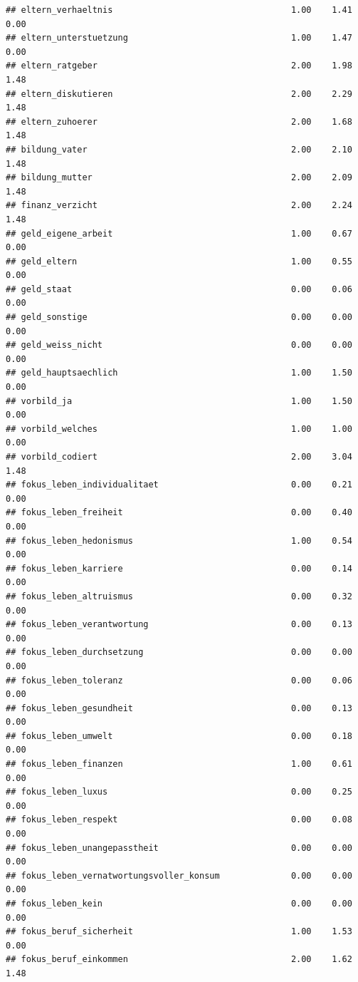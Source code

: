 \documentclass[
]{book}
\begin{document}
\begin{verbatim}
## eltern_verhaeltnis                                   1.00    1.41   0.00
## eltern_unterstuetzung                                1.00    1.47   0.00
## eltern_ratgeber                                      2.00    1.98   1.48
## eltern_diskutieren                                   2.00    2.29   1.48
## eltern_zuhoerer                                      2.00    1.68   1.48
## bildung_vater                                        2.00    2.10   1.48
## bildung_mutter                                       2.00    2.09   1.48
## finanz_verzicht                                      2.00    2.24   1.48
## geld_eigene_arbeit                                   1.00    0.67   0.00
## geld_eltern                                          1.00    0.55   0.00
## geld_staat                                           0.00    0.06   0.00
## geld_sonstige                                        0.00    0.00   0.00
## geld_weiss_nicht                                     0.00    0.00   0.00
## geld_hauptsaechlich                                  1.00    1.50   0.00
## vorbild_ja                                           1.00    1.50   0.00
## vorbild_welches                                      1.00    1.00   0.00
## vorbild_codiert                                      2.00    3.04   1.48
## fokus_leben_individualitaet                          0.00    0.21   0.00
## fokus_leben_freiheit                                 0.00    0.40   0.00
## fokus_leben_hedonismus                               1.00    0.54   0.00
## fokus_leben_karriere                                 0.00    0.14   0.00
## fokus_leben_altruismus                               0.00    0.32   0.00
## fokus_leben_verantwortung                            0.00    0.13   0.00
## fokus_leben_durchsetzung                             0.00    0.00   0.00
## fokus_leben_toleranz                                 0.00    0.06   0.00
## fokus_leben_gesundheit                               0.00    0.13   0.00
## fokus_leben_umwelt                                   0.00    0.18   0.00
## fokus_leben_finanzen                                 1.00    0.61   0.00
## fokus_leben_luxus                                    0.00    0.25   0.00
## fokus_leben_respekt                                  0.00    0.08   0.00
## fokus_leben_unangepasstheit                          0.00    0.00   0.00
## fokus_leben_vernatwortungsvoller_konsum              0.00    0.00   0.00
## fokus_leben_kein                                     0.00    0.00   0.00
## fokus_beruf_sicherheit                               1.00    1.53   0.00
## fokus_beruf_einkommen                                2.00    1.62   1.48

\end{verbatim}
\end{document}
